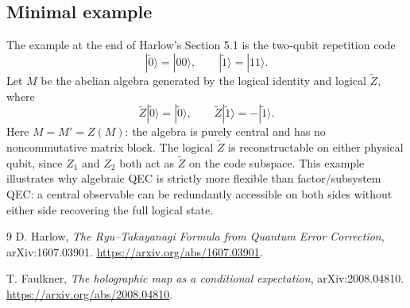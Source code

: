 \documentclass[11pt]{article}
\newcommand{\ket}[1]{|#1\rangle}
\newcommand{\wt}[1]{\widetilde{#1}}
\begin{document}
\subsection*{Minimal example}

The example at the end of Harlow's Section 5.1 is the two-qubit repetition
code
\[
    \ket{\wt{0}}=\ket{00},
    \qquad
    \ket{\wt{1}}=\ket{11}.
\]
Let \(M\) be the abelian algebra generated by the logical identity and logical
\(\wt{Z}\), where
\[
    \wt{Z}\ket{\wt{0}}=\ket{\wt{0}},
    \qquad
    \wt{Z}\ket{\wt{1}}=-\ket{\wt{1}}.
\]
Here \(M=M'=Z(M)\): the algebra is purely central and has no noncommutative
matrix block.  The logical \(\wt{Z}\) is reconstructable on either physical
qubit, since \(Z_1\) and \(Z_2\) both act as \(\wt{Z}\) on the code subspace.
This example illustrates why algebraic QEC is strictly more flexible than
factor/subsystem QEC: a central observable can be redundantly accessible on both
sides without either side recovering the full logical state.

\begin{thebibliography}{9}
D. Harlow,
\emph{The Ryu--Takayanagi Formula from Quantum Error Correction},
arXiv:1607.03901.
\url{https://arxiv.org/abs/1607.03901}.

T. Faulkner,
\emph{The holographic map as a conditional expectation},
arXiv:2008.04810.
\url{https://arxiv.org/abs/2008.04810}.
\end{thebibliography}
\end{document}
